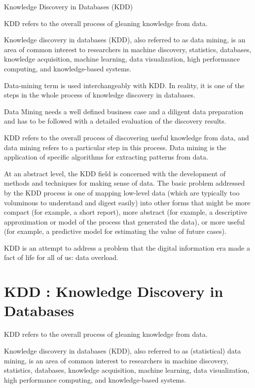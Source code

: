 Knowledge Discovery in Databases (KDD)

KDD refers to the overall process of gleaning knowledge from data.

Knowledge discovery in databases (KDD), also referred to as data mining, is an area of common interest to researchers in machine discovery, statistics, databases, knowledge acquisition, machine learning, data visualization, high performance computing, and knowledge-based systems.

Data-mining term is used interchangeably with KDD. In reality, it is one of the steps in the whole process of knowledge discovery in databases. 

Data Mining needs a well defined business case and a diligent data preparation and has to be followed with a detailed evaluation of the discovery results.

KDD refers to the overall process of discovering useful knowledge from data, and data mining refers to a particular step in this process. Data mining is the application of specific algorithms for extracting patterns from data.

At an abstract level, the KDD field is concerned with the development of methods and techniques for making sense of data. The basic problem addressed by the KDD process is one of mapping low-level data (which are typically too voluminous to understand and digest easily) into other forms that might be more compact (for example, a short report), more abstract (for example, a descriptive approximation or model of the process that generated the data), or more useful (for example, a predictive model for estimating the value of future cases).

KDD is an attempt to address a problem that the digital information era made a fact of life for all of us: data overload.





\section{KDD : Knowledge Discovery in Databases}

KDD refers to the overall process of gleaning knowledge from data.


Knowledge discovery in databases (KDD), also referred to as (statistical) data mining, is an area of common interest to researchers in machine discovery, statistics, databases, knowledge acquisition, machine learning, data visualization, high performance computing, and knowledge-based systems.


